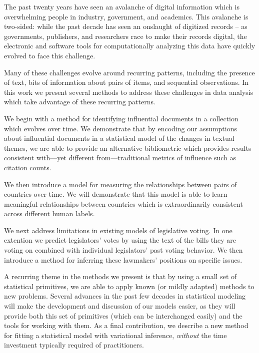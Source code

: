 The past twenty years have seen an avalanche of digital information which is overwhelming people in industry, government, and academics.  This avalanche is two-sided: while the past decade has seen an onslaught of digitized records -- as governments, publishers, and researchers race to make their records digital, the electronic and software tools for computationally analyzing this data have quickly evolved to face this challenge.

Many of these challenges evolve around recurring patterns, including the presence of text, bits of information about pairs of items, and sequential observations.  In this work we present several methods to address these challenges in data analysis which take advantage of these recurring patterns.

We begin with a method for identifying influential documents in a collection which evolves over time.  We demonstrate that by encoding our assumptions about influential documents in a statistical model of the changes in textual themes, we are able to provide an alternative bibliometric which provides results consistent with---yet different from---traditional metrics of influence such as citation counts.

We then introduce a model for measuring the relationships between pairs of countries over time.  We will demonstrate that this model is able to learn meaningful relationships between countries which is extraordinarily consistent across different human labels.

We next address limitations in existing models of legislative voting.  In one extention we predict legislators' votes by using the text of the bills they are voting on combined with individual legislators' past voting behavior.  We then introduce a method for inferring these lawmakers' positions on specific issues.

A recurring theme in the methods we present is that by using a small set of statistical primitives, we are able to apply known (or mildly adapted) methods to new problems.  Several advances in the past few decades in statistical modeling will make the development and discussion of our models easier, as they will provide both this set of primitives (which can be interchanged easily) and the tools for working with them.  As a final contribution, we describe a new method for fitting a statistical model with variational inference, \emph{without} the time investment typically required of practitioners.

